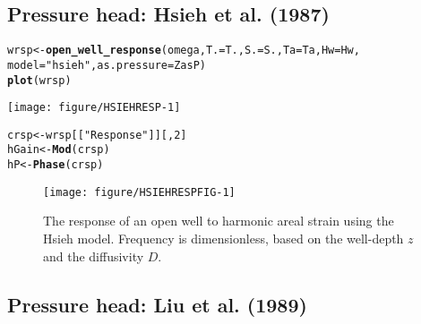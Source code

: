 \documentclass[12pt]{article}\usepackage[]{graphicx}\usepackage[]{xcolor}
\makeatletter
\def\maxwidth{ %
  \ifdim\Gin@nat@width>\linewidth
    \linewidth
  \else
    \Gin@nat@width
  \fi
}
\newcommand{\hlnum}[1]{\textcolor[rgb]{0.686,0.059,0.569}{#1}}%
\newcommand{\hlsng}[1]{\textcolor[rgb]{0.192,0.494,0.8}{#1}}%
\newcommand{\hldef}[1]{\textcolor[rgb]{0.345,0.345,0.345}{#1}}%
\newcommand{\hlkwb}[1]{\textcolor[rgb]{0.69,0.353,0.396}{#1}}%
\newcommand{\hlkwc}[1]{\textcolor[rgb]{0.333,0.667,0.333}{#1}}%
\newcommand{\hlkwd}[1]{\textcolor[rgb]{0.737,0.353,0.396}{\textbf{#1}}}%
\newenvironment{kframe}{%
 \def\at@end@of@kframe{}%
 \ifinner\ifhmode%
  \def\at@end@of@kframe{\end{minipage}}%
  \begin{minipage}{\columnwidth}%
 \fi\fi%
 \def\FrameCommand##1{\hskip\@totalleftmargin \hskip-\fboxsep
 \colorbox{shadecolor}{##1}\hskip-\fboxsep
     \hskip-\linewidth \hskip-\@totalleftmargin \hskip\columnwidth}%
 \MakeFramed {\advance\hsize-\width
   \@totalleftmargin\z@ \linewidth\hsize
   \@setminipage}}%
 {\par\unskip\endMakeFramed%
 \at@end@of@kframe}
\newenvironment{knitrout}{}{} %
\makeatother
\begin{document}
\clearpage
\subsection{Pressure head: Hsieh et al. (1987)}

\begin{knitrout}\small
{}\color{fgcolor}\begin{kframe}
\begin{alltt}
\hldef{wrsp} \hlkwb{<-} \hlkwd{open_well_response}\hldef{(omega,} \hlkwc{T.} \hldef{= T.,} \hlkwc{S.} \hldef{= S.,} \hlkwc{Ta} \hldef{= Ta,} \hlkwc{Hw} \hldef{= Hw,}
    \hlkwc{model} \hldef{=} \hlsng{"hsieh"}\hldef{,} \hlkwc{as.pressure} \hldef{= ZasP)}
\hlkwd{plot}\hldef{(wrsp)}
\end{alltt}
\end{kframe}
\texttt{[image: figure/HSIEHRESP-1]} 
\begin{kframe}\begin{alltt}
\hldef{crsp} \hlkwb{<-} \hldef{wrsp[[}\hlsng{"Response"}\hldef{]][,} \hlnum{2}\hldef{]}
\hldef{hGain} \hlkwb{<-} \hlkwd{Mod}\hldef{(crsp)}
\hldef{hP} \hlkwb{<-} \hlkwd{Phase}\hldef{(crsp)}
\end{alltt}
\end{kframe}
\end{knitrout}

\begin{figure}[htb!]
\begin{center}
\begin{knitrout}\small
{}\color{fgcolor}
\texttt{[image: figure/HSIEHRESPFIG-1]} 
\end{knitrout}
\caption{The response of an open well to harmonic areal strain using
the Hsieh model. 
Frequency is dimensionless, based on the well-depth $z$ and the diffusivity $D$.
}
\label{fig:owrsp-hsi}
\end{center}
\end{figure}

\clearpage
\subsection{Pressure head: Liu et al. (1989)}
\end{document}
